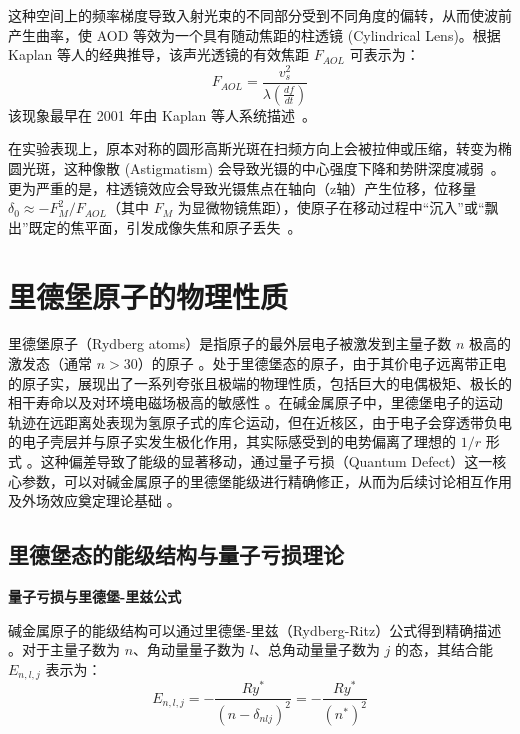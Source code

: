 \documentclass[../main.tex]{subfiles}
\begin{document}
这种空间上的频率梯度导致入射光束的不同部分受到不同角度的偏转，从而使波前产生曲率，使 AOD 等效为一个具有随动焦距的柱透镜 (Cylindrical Lens)。根据 Kaplan 等人的经典推导，该声光透镜的有效焦距 $F_{AOL}$ 可表示为：
\begin{equation}
F_{AOL} = \frac{v_s^2}{\lambda \left( \frac{df}{dt} \right)}
\end{equation}
该现象最早在 2001 年由 Kaplan 等人系统描述~\cite{kaplan2001acousto}。

在实验表现上，原本对称的圆形高斯光斑在扫频方向上会被拉伸或压缩，转变为椭圆光斑，这种像散 (Astigmatism) 会导致光镊的中心强度下降和势阱深度减弱~\cite{guo2025acousto}。更为严重的是，柱透镜效应会导致光镊焦点在轴向（z轴）产生位移，位移量 $\delta_0 \approx -F_M^2 / F_{AOL}$（其中 $F_M$ 为显微物镜焦距），使原子在移动过程中“沉入”或“飘出”既定的焦平面，引发成像失焦和原子丢失~\cite{lu2025astigmatism}。


\section{里德堡原子的物理性质}

里德堡原子（Rydberg atoms）是指原子的最外层电子被激发到主量子数 $n$ 极高的激发态（通常 $n > 30$）的原子 。处于里德堡态的原子，由于其价电子远离带正电的原子实，展现出了一系列夸张且极端的物理性质，包括巨大的电偶极矩、极长的相干寿命以及对环境电磁场极高的敏感性 。在碱金属原子中，里德堡电子的运动轨迹在远距离处表现为氢原子式的库仑运动，但在近核区，由于电子会穿透带负电的电子壳层并与原子实发生极化作用，其实际感受到的电势偏离了理想的 $1/r$ 形式 。这种偏差导致了能级的显著移动，通过量子亏损（Quantum Defect）这一核心参数，可以对碱金属原子的里德堡能级进行精确修正，从而为后续讨论相互作用及外场效应奠定理论基础 。

\subsection{里德堡态的能级结构与量子亏损理论}

\textbf{量子亏损与里德堡-里兹公式}

碱金属原子的能级结构可以通过里德堡-里兹（Rydberg-Ritz）公式得到精确描述 。对于主量子数为 $n$、角动量量子数为 $l$、总角动量量子数为 $j$ 的态，其结合能 $E_{n,l,j}$ 表示为：
\begin{equation}
E_{n,l,j} = -\frac{Ry^*}{(n - \delta_{nlj})^2} = -\frac{Ry^*}{(n^*)^2}
\end{equation}
\end{document}
